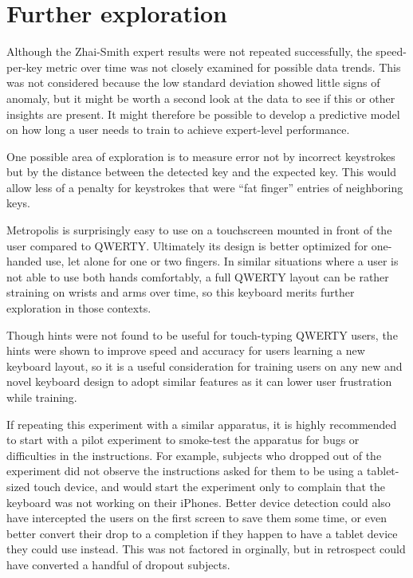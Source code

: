 \documentclass[english]{vgtc}
\begin{document}
\section{Further exploration}
Although the Zhai-Smith expert results were not repeated successfully, the speed-per-key metric over time was not closely examined for possible data trends.  This was not considered because the low standard deviation showed little signs of anomaly, but it might be worth a second look at the data to see if this or other insights are present. It might therefore be possible to develop a predictive model on how long a user needs to train to achieve expert-level performance.

One possible area of exploration is to measure error not by incorrect keystrokes but by the distance between the detected key and the expected key. \cite{Jain11} This would allow less of a penalty for keystrokes that were \textquotedblleft fat finger\textquotedblright{} entries of neighboring keys.

Metropolis is surprisingly easy to use on a touchscreen mounted in front of the user compared to QWERTY. Ultimately its design is better optimized for one-handed use, let alone for one or two fingers.  In similar situations where a user is not able to use both hands comfortably, a full QWERTY layout can be rather straining on wrists and arms over time, so this keyboard merits further exploration in those contexts.

Though hints were not found to be useful for touch-typing QWERTY users, the hints were shown to improve speed and accuracy for users learning a new keyboard layout, so it is a useful consideration for training users on any new and novel keyboard design to adopt similar features as it can lower user frustration while training.

If repeating this experiment with a similar apparatus, it is highly recommended to start with a pilot experiment to smoke-test the apparatus for bugs or difficulties in the instructions.  For example, subjects who dropped out of the experiment did not observe the instructions asked for them to be using a tablet-sized touch device, and would start the experiment only to complain that the keyboard was not working on their iPhones.  Better device detection could also have intercepted the users on the first screen to save them some time, or even better convert their drop to a completion if they happen to have a tablet device they could use instead.  This was not factored in orginally, but in retrospect could have converted a handful of dropout subjects.
\end{document}
